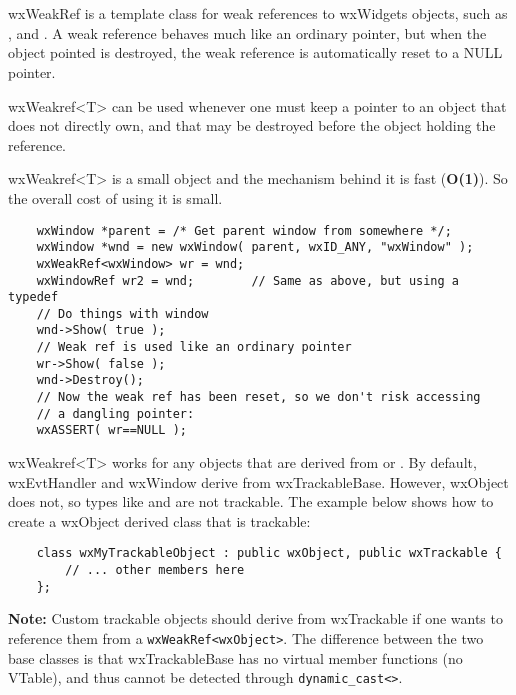 \section{}\label{wxweakref}

wxWeakRef is a template class for weak references to wxWidgets objects, 
such as ,  and 
. A weak reference behaves much like an ordinary
pointer, but when the object pointed is destroyed, the weak reference is
automatically reset to a NULL pointer. 

wxWeakref<T> can be used whenever one must keep a pointer to an object 
that does not directly own, and that may be destroyed before the object 
holding the reference. 

wxWeakref<T> is a small object and the mechanism behind it is fast 
(\textbf{O(1)}). So the overall cost of using it is small. 



\begin{verbatim}
    wxWindow *parent = /* Get parent window from somewhere */;
    wxWindow *wnd = new wxWindow( parent, wxID_ANY, "wxWindow" );
    wxWeakRef<wxWindow> wr = wnd;  
    wxWindowRef wr2 = wnd;        // Same as above, but using a typedef
    // Do things with window
    wnd->Show( true );
    // Weak ref is used like an ordinary pointer 
    wr->Show( false );
    wnd->Destroy(); 
    // Now the weak ref has been reset, so we don't risk accessing
    // a dangling pointer:
    wxASSERT( wr==NULL );
\end{verbatim}

wxWeakref<T> works for any objects that are derived from 
 or .
By default, wxEvtHandler and wxWindow derive from wxTrackableBase. However, 
wxObject does not, so types like  and 
 are not trackable. The example below shows how to
create a wxObject derived class that is trackable: 

\begin{verbatim}
    class wxMyTrackableObject : public wxObject, public wxTrackable { 
        // ... other members here 
    }; 
\end{verbatim}

\textbf{Note:} Custom trackable objects should derive from wxTrackable 
if one wants to reference them from a \texttt{wxWeakRef<wxObject>}. The 
difference between the two base classes is that wxTrackableBase 
has no virtual member functions (no VTable), and thus cannot be detected
through \texttt{dynamic\_cast<>}.


